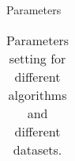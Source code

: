 \documentclass{beamer}
\begin{document}
\begin{frame}{Parameters}
	\begin{small}
	\begin{table}[h]
		\caption{Parameters setting for different algorithms and different datasets. }
		
		\begin{center}
			\begin{tabular}{llllll}
				

\end{tabular}
\end{center}
\end{table}
\end{small}
\end{frame}
\end{document}
